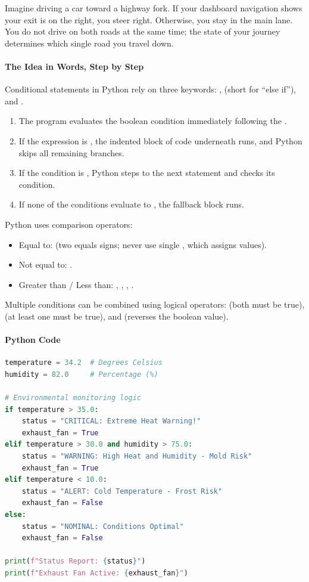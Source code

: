 \begin{analogy}
Imagine driving a car toward a highway fork. If your dashboard navigation shows your exit is on the right, you steer right. Otherwise, you stay in the main lane. You do not drive on both roads at the same time; the state of your journey determines which single road you travel down.
\end{analogy}

\paragraph{The Idea in Words, Step by Step}
Conditional statements in Python rely on three keywords: ,  (short for ``else if''), and .
\begin{enumerate}
    \item The program evaluates the boolean condition immediately following the .
    \item If the expression is , the indented block of code underneath runs, and Python skips all remaining branches.
    \item If the condition is , Python steps to the next  statement and checks its condition.
    \item If none of the conditions evaluate to , the fallback  block runs.
\end{enumerate}

Python uses comparison operators:
\begin{itemize}
    \item Equal to: \code{==} (two equals signs; never use single \code{=}, which assigns values).
    \item Not equal to: \code{!=}.
    \item Greater than / Less than: \code{>}, \code{<}, \code{>=}, \code{<=}.
\end{itemize}
Multiple conditions can be combined using logical operators:  (both must be true),  (at least one must be true), and  (reverses the boolean value).

\paragraph{Python Code}
\begin{lstlisting}[language=Python]
temperature = 34.2  # Degrees Celsius
humidity = 82.0     # Percentage (%)

# Environmental monitoring logic
if temperature > 35.0:
    status = "CRITICAL: Extreme Heat Warning!"
    exhaust_fan = True
elif temperature > 30.0 and humidity > 75.0:
    status = "WARNING: High Heat and Humidity - Mold Risk"
    exhaust_fan = True
elif temperature < 10.0:
    status = "ALERT: Cold Temperature - Frost Risk"
    exhaust_fan = False
else:
    status = "NOMINAL: Conditions Optimal"
    exhaust_fan = False

print(f"Status Report: {status}")
print(f"Exhaust Fan Active: {exhaust_fan}")
\end{lstlisting}

